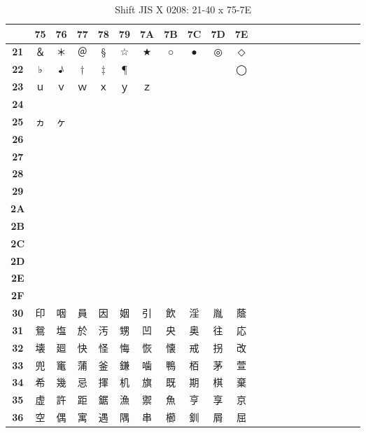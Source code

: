 \begin{table}[H]
\centering
\caption{Shift JIS X 0208: 21-40 x 75-7E}
\begin{tabular}{|Sc|Sc|Sc|Sc|Sc|Sc|Sc|Sc|Sc|Sc|Sc|}
\hline
 & \textbf{75} & \textbf{76} & \textbf{77} & \textbf{78} & \textbf{79} & \textbf{7A} & \textbf{7B} & \textbf{7C} & \textbf{7D} & \textbf{7E} \\ \hline
\textbf{21} & ＆ & ＊ & ＠ & § & ☆ & ★ & ○ & ● & ◎ & ◇ \\ \hline
\textbf{22} & ♭ & ♪ & † & ‡ & ¶ &   &   &   &   & ◯ \\ \hline
\textbf{23} & ｕ & ｖ & ｗ & ｘ & ｙ & ｚ &   &   &   &   \\ \hline
\textbf{24} &   &   &   &   &   &   &   &   &   &   \\ \hline
\textbf{25} & ヵ & ヶ &   &   &   &   &   &   &   &   \\ \hline
\textbf{26} &  &  &  &  &  &  &  &  &  &  \\ \hline
\textbf{27} &   &   &   &   &   &   &   &   &   &   \\ \hline
\textbf{28} &  &  &  &  &  &  &  &  &  &  \\ \hline
\textbf{29} &  &  &  &  &  &  &  &  &  &  \\ \hline
\textbf{2A} &  &  &  &  &  &  &  &  &  &  \\ \hline
\textbf{2B} &  &  &  &  &  &  &  &  &  &  \\ \hline
\textbf{2C} &  &  &  &  &  &  &  &  &  &  \\ \hline
\textbf{2D} &  &  &  &  &  &  &  &  &  &  \\ \hline
\textbf{2E} &  &  &  &  &  &  &  &  &  &  \\ \hline
\textbf{2F} &  &  &  &  &  &  &  &  &  &  \\ \hline
\textbf{30} & 印 & 咽 & 員 & 因 & 姻 & 引 & 飲 & 淫 & 胤 & 蔭 \\ \hline
\textbf{31} & 鴛 & 塩 & 於 & 汚 & 甥 & 凹 & 央 & 奥 & 往 & 応 \\ \hline
\textbf{32} & 壊 & 廻 & 快 & 怪 & 悔 & 恢 & 懐 & 戒 & 拐 & 改 \\ \hline
\textbf{33} & 兜 & 竃 & 蒲 & 釜 & 鎌 & 噛 & 鴨 & 栢 & 茅 & 萱 \\ \hline
\textbf{34} & 希 & 幾 & 忌 & 揮 & 机 & 旗 & 既 & 期 & 棋 & 棄 \\ \hline
\textbf{35} & 虚 & 許 & 距 & 鋸 & 漁 & 禦 & 魚 & 亨 & 享 & 京 \\ \hline
\textbf{36} & 空 & 偶 & 寓 & 遇 & 隅 & 串 & 櫛 & 釧 & 屑 & 屈 \\ \hline

\end{tabular}
\end{table}
